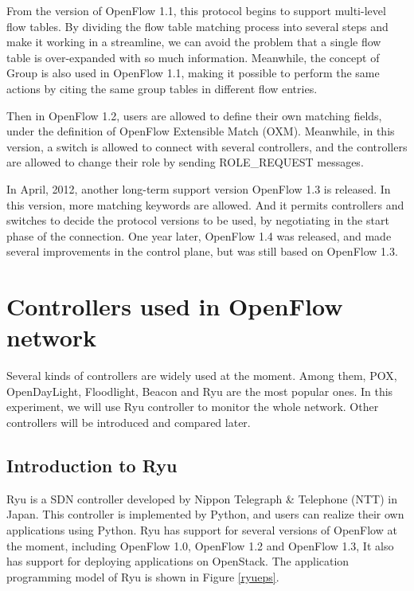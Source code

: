 From the version of OpenFlow 1.1, this protocol begins to support multi-level flow tables. By dividing the flow table matching process into several steps and make it working in a streamline, we can avoid the problem that a single flow table is over-expanded with so much information. Meanwhile, the concept of Group is also used in OpenFlow 1.1, making it possible to perform the same actions by citing the same group tables in different flow entries.

Then in OpenFlow 1.2, users are allowed to define their own matching fields, under the definition of OpenFlow Extensible Match (OXM). Meanwhile, in this version, a switch is allowed to connect with several controllers, and the controllers are allowed to change their role by sending ROLE\_REQUEST messages.

In April, 2012, another long-term support version OpenFlow 1.3 is released. In this version, more matching keywords are allowed. And it permits controllers and switches to decide the protocol versions to be used, by negotiating in the start phase of the connection. One year later, OpenFlow 1.4 was released, and made several improvements in the control plane, but was still based on OpenFlow 1.3.

\section{Controllers used in OpenFlow network}
\label{sec:Controllers used in OpenFlow network}

Several kinds of controllers are widely used at the moment. Among them, POX, OpenDayLight, Floodlight, Beacon and Ryu are the most popular ones. In this experiment, we will use Ryu controller to monitor the whole network. Other controllers will be introduced and compared later.

\subsection{Introduction to Ryu}
\label{sec:Introduction to Ryu}

Ryu \cite{ryu} is a SDN controller developed by Nippon Telegraph \& Telephone (NTT) in Japan.
This controller is implemented by Python, and users can realize their own applications using Python. Ryu has support for several versions of OpenFlow at the moment, including OpenFlow 1.0, OpenFlow 1.2 and OpenFlow 1.3, It also has support for deploying applications on OpenStack. The application programming model of Ryu is shown in Figure \ref{ryueps}.

